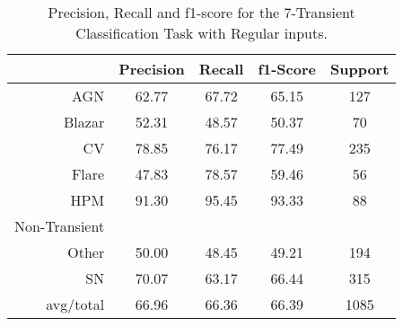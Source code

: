 \begin{table}
\centering
\begin{tabular}{|r|c|c|c|c|}
\hline
\multicolumn{1}{|l|}{} & Precision & Recall & f1-Score & Support \\ \hline \hline
AGN                    & 62.77              & 67.72             & 65.15             & 127             \\ \hline
Blazar                 & 52.31           & 48.57          & 50.37          & 70          \\ \hline
CV                     & 78.85               & 76.17              & 77.49              & 235              \\ \hline
Flare                  & 47.83            & 78.57           & 59.46           & 56           \\ \hline
HPM                    & 91.30              & 95.45             & 93.33             & 88             \\ \hline
Non-Transient          &     &    &    &    \\ \hline
Other                  & 50.00            & 48.45           & 49.21           & 194           \\ \hline
SN                     & 70.07               & 63.17              & 66.44              & 315              \\ \hline
avg/total              & 66.96            & 66.36           & 66.39           & 1085           \\ \hline
\end{tabular}
\caption{Precision, Recall and f1-score for the 7-Transient Classification Task with Regular inputs.}
\label{Overall-Scores-7-Transient-Regular}
\end{table}
